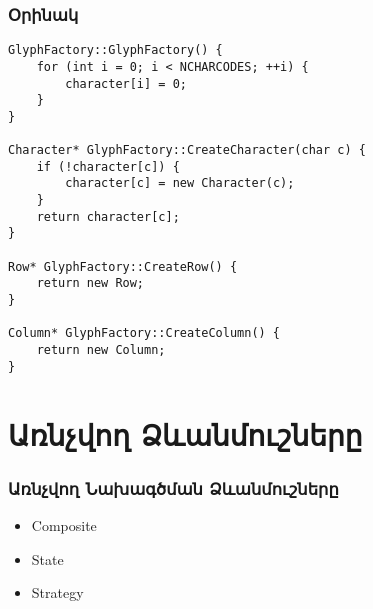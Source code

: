 \documentclass{beamer}
\begin{document}
\begin{frame}[fragile]\frametitle{Օրինակ}
\begin{english}
\begin{verbatim}
GlyphFactory::GlyphFactory() {
    for (int i = 0; i < NCHARCODES; ++i) {
        character[i] = 0;
    }
}

Character* GlyphFactory::CreateCharacter(char c) {
    if (!character[c]) {
        character[c] = new Character(c);
    }
    return character[c];
}

Row* GlyphFactory::CreateRow() {
    return new Row;
}

Column* GlyphFactory::CreateColumn() {
    return new Column;
}
\end{verbatim}
\end{english}
\end{frame}

\section{Առնչվող Ձևանմուշները}
\begin{frame}\frametitle{Առնչվող Նախագծման Ձևանմուշները}
\begin{itemize}
    \item Composite \vfill
    \item State \vfill
    \item Strategy
\end{itemize}
\end{frame}
\end{document}
